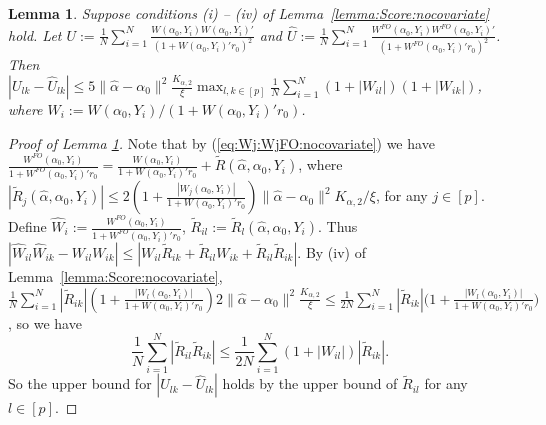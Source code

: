 \documentclass[11pt]{article}
\newtheorem{lemma}{Lemma}
\begin{document}
\begin{lemma}\label{lemma:MatrixConnection}
Suppose conditions (i) -- (iv) of Lemma~\ref{lemma:Score:nocovariate} hold. Let $U:= \frac{1}{N}\sum_{i=1}^N \frac{W(\alpha_0,Y_i)W(\alpha_0,Y_i)'}{(1+W(\alpha_0,Y_i)'r_0)^2}$ and 
$\hat U:= \frac{1}{N}\sum_{i=1}^N \frac{W^{FO}(\alpha_0,Y_i)  W^{FO}(\alpha_0,Y_i)'}{(1+W^{FO}(\alpha_0,Y_i)'r_0)^2}$. 
Then $\left| U_{lk} - \hat U_{lk} \right| \leq 5\|\hat\alpha - \alpha_0\|^2 \frac{K_{\alpha,2}}{\xi} \max_{l,k\in[p]}\frac{1}{N}\sum_{i=1}^N(1+|W_{il}|)(1+|W_{ik}|)$, where $W_i:=W(\alpha_0,Y_i)/(1+W(\alpha_0,Y_i)'r_0)$.
\end{lemma}
\begin{proof}[Proof of Lemma \ref{lemma:MatrixConnection}]
Note that by (\ref{eq:Wj:WjFO:nocovariate}) we have $\frac{W^{FO}(\alpha_0,Y_i) }{1+W^{FO}(\alpha_0,Y_i)'r_0} =  \frac{W(\alpha_0,Y_i)}{1+W(\alpha_0,Y_i)'r_0} + \widetilde R(\hat\alpha,\alpha_0,Y_i)$,
where $|\widetilde R_j(\hat{\alpha},\alpha_0,Y_i)| \leq  2\left(1+\frac{|W_j(\alpha_0,Y_i)| }{1+W(\alpha_0,Y_i)'r_0}\right) \|\hat\alpha - \alpha_0\|^2 K_{\alpha,2}/\xi$, for any $j\in[p]$. Define 
$\hat W_i := \frac{W^{FO}(\alpha_0,Y_i) }{1+W^{FO}(\alpha_0,Y_i)'r_0}$, $\tilde R_{il}:=\tilde R_l(\hat{\alpha},\alpha_0,Y_i)$. Thus 
$\left|\hat W_{il}\hat W_{ik} -W_{il}W_{ik}\right| \leq \left| W_{il}\tilde R_{ik} + \tilde R_{il} W_{ik} + \tilde R_{il}\tilde R_{ik}\right|$. By (iv) of Lemma~\ref{lemma:Score:nocovariate}, $\frac{1}{N}\sum_{i=1}^N|\tilde{R}_{ik}|\left(1+\frac{|W_l(\alpha_0,Y_i)|}{1+W(\alpha_0,Y_i)'r_0}\right)2\|\hat\alpha - \alpha_0\|^2 \frac{K_{\alpha,2}}{\xi} \leq \frac{1}{2N}\sum_{i=1}^N|\tilde{R}_{ik}|\big(1+\frac{|W_l(\alpha_0,Y_i)|}{1+W(\alpha_0,Y_i)'r_0}\big)$, so we have 
$$\frac{1}{N}\sum_{i=1}^N |\tilde R_{il}\tilde R_{ik}|\leq\frac{1}{2N}\sum_{i=1}^N (1+|W_{il}|)|\tilde R_{ik}|.$$ 
So the upper bound for $\left| U_{lk} - \hat U_{lk} \right|$ holds by the upper bound of $\tilde{R}_{il}$ for any $l\in[p]$.
\end{proof}
\end{document}
